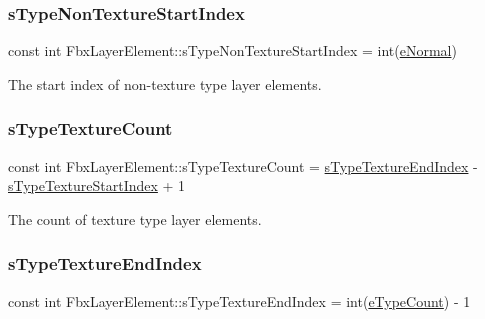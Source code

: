 \subsubsection{\texorpdfstring{s\+Type\+Non\+Texture\+Start\+Index}{sTypeNonTextureStartIndex}}
{\footnotesize\ttfamily const int Fbx\+Layer\+Element\+::s\+Type\+Non\+Texture\+Start\+Index = int(\hyperlink{class_fbx_layer_element_a8c95c5cd880b56c776acd379bd86f42cae9b273e2ecbd6c3d1443447d85787f14}{e\+Normal})\hspace{0.3cm}{\ttfamily [static]}}



The start index of non-\/texture type layer elements. 

\mbox{\label{class_fbx_layer_element_ae7a09ea6aa90f96d37a9e161b9f54094}} 
\subsubsection{\texorpdfstring{s\+Type\+Texture\+Count}{sTypeTextureCount}}
{\footnotesize\ttfamily const int Fbx\+Layer\+Element\+::s\+Type\+Texture\+Count = \hyperlink{class_fbx_layer_element_aba954f68e4ad849fe7bd18dcd1d2b3ff}{s\+Type\+Texture\+End\+Index} -\/ \hyperlink{class_fbx_layer_element_a207301b1a6ecb7cdbce89cb44093d0b7}{s\+Type\+Texture\+Start\+Index} + 1\hspace{0.3cm}{\ttfamily [static]}}



The count of texture type layer elements. 

\mbox{\label{class_fbx_layer_element_aba954f68e4ad849fe7bd18dcd1d2b3ff}} 
\subsubsection{\texorpdfstring{s\+Type\+Texture\+End\+Index}{sTypeTextureEndIndex}}
{\footnotesize\ttfamily const int Fbx\+Layer\+Element\+::s\+Type\+Texture\+End\+Index = int(\hyperlink{class_fbx_layer_element_a8c95c5cd880b56c776acd379bd86f42ca0facfbd6e8c7e8dab94db7b1b68166d5}{e\+Type\+Count}) -\/ 1\hspace{0.3cm}{\ttfamily [static]}}



